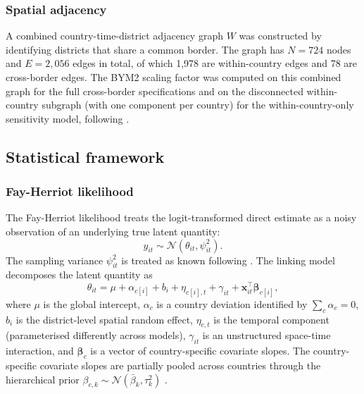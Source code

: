 \documentclass{article}
\begin{document}
\subsubsection{Spatial adjacency}\label{spatial-adjacency}

A combined country-time-district adjacency graph \(W\) was constructed
by identifying districts that share a common border. The graph has
\(N = 724\) nodes and \(E = 2{,}056\) edges in total, of which 1,978 are
within-country edges and 78 are cross-border edges. The BYM2 scaling
factor \citep{riebler2016} was computed on this combined graph for the
full cross-border specifications and on the disconnected within-country
subgraph (with one component per country) for the within-country-only
sensitivity model, following \citep{freni2018}.

\subsection{Statistical framework}\label{statistical-framework}

\subsubsection{Fay-Herriot likelihood}\label{fay-herriot-likelihood}

The Fay-Herriot likelihood \citep{fay1979} treats the logit-transformed
direct estimate as a noisy observation of an underlying true latent
quantity: \begin{equation}
y_{it} \sim \mathcal{N}(\theta_{it}, \psi_{it}^2).
\label{eq:lik}
\end{equation} The sampling variance \(\psi_{it}^2\) is treated as known
following \citep{you2002}. The linking model decomposes the latent
quantity as \begin{equation}
\theta_{it} = \mu + \alpha_{c[i]} + b_i + \eta_{c[i], t} + \gamma_{it}
              + \mathbf{x}_{it}^{\top}\bm{\beta}_{c[i]},
\label{eq:link}
\end{equation} where \(\mu\) is the global intercept, \(\alpha_c\) is a
country deviation identified by \(\sum_c \alpha_c = 0\), \(b_i\) is the
district-level spatial random effect, \(\eta_{c,t}\) is the temporal
component (parameterised differently across models), \(\gamma_{it}\) is
an unstructured space-time interaction, and \(\bm{\beta}_c\) is a vector
of country-specific covariate slopes. The country-specific covariate
slopes are partially pooled across countries through the hierarchical
prior \(\beta_{c,k} \sim \mathcal{N}(\bar\beta_k, \tau_k^2)\)
\citep{gelman2006}.
\end{document}
